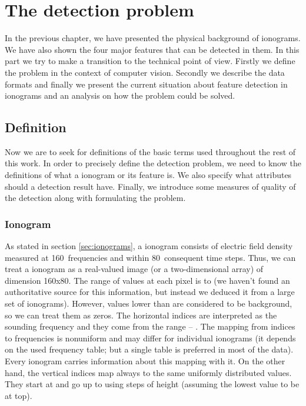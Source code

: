 \chapter{The detection problem}
In the previous chapter, we have presented the physical background of ionograms. We have also shown the four major features that can be detected in them. In this part we try to make a transition to the technical point of view. Firstly we define the problem in the context of computer vision. Secondly we describe the data formats and finally we present the current situation about feature detection in ionograms and an analysis on how the problem could be solved.

\section{Definition}
Now we are to seek for definitions of the basic terms used throughout the rest of this work. In order to precisely define the detection problem, we need to know the definitions of what a ionogram or its feature is. We also specify what attributes should a detection result have. Finally, we introduce some measures of quality of the detection along with formulating the problem.

\subsection{Ionogram}
As stated in section \ref{sec:ionograms}, a ionogram consists of electric field density measured at 160~frequencies and within 80~consequent time steps. Thus, we can treat a ionogram as a real-valued image (or a two-dimensional array) of dimension 160x80. The range of values at each pixel is  to  (we haven't found an authoritative source for this information, but instead we deduced it from a large set of ionograms). However, values lower than  are considered to be background, so we can treat them as zeros. The horizontal indices are interpreted as the sounding frequency and they come from the range  -- . The mapping from indices to frequencies is nonuniform and may differ for individual ionograms (it depends on the used frequency table; but a single table is preferred in most of the data). Every ionogram carries information about this mapping with it. On the other hand, the vertical indices map always to the same uniformly distributed values. They start at  and go up to  using steps of height  (assuming the lowest value to be at top). 

